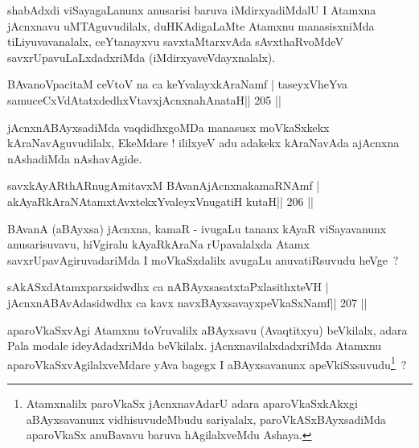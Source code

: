 \begin{artha}
shabAdxdi viSayagaLanunx anusarisi baruva iMdirxyadiMdalU I Atamxna jAcnxnavu uMTAguvudilalx, duHKAdigaLaMte Atamxnu manasisxniMda tiLiyuvavanalalx, ceYtanayxvu savxtaMtarxvAda sAvxthaRvoMdeV savxrUpavuLaLxdadxriMda (iMdirxyaveVdayxnalalx).
\end{artha}


\begin{shl}
BAvanoVpacitaM ceVtoV na ca keYvalayxkAraNamf |
taseyxVheYva samuceCxVdAtatxdedhxVtavxjAcnxnahAnataH\hfill || 205 ||
\end{shl}

\begin{artha}
jAcnxnABAyxsadiMda vaqdidhxgoMDa manasusx moVkaSxkekx kAraNavAguvudilalx, EkeMdare ! ililxyeV adu adakekx kAraNavAda ajAcnxna nAshadiMda nAshavAgide.
\end{artha}

\begin{shl}
savxkAyARthARnugAmitavxM BAvanAjAcnxnakamaRNAmf |
akAyaRkAraNAtamxtAvxtekxYvaleyxV\s nugatiH kutaH\hfill || 206 ||
\end{shl}

\begin{artha}
BAvanA (aBAyxsa) jAcnxna, kamaR - ivugaLu tananx kAyaR viSayavanunx anusarisuvavu, hiVgiralu kAyaRkAraNa rUpavalalxda Atamx savxrUpavAgiruvadariMda I moVkaSxdalilx avugaLu anuvatiRsuvudu heVge~?
\end{artha}

\begin{shl}
sAkASxdAtamxparxsidwdhx ca nABAyxsasatxtaPxlasithxteVH |
jAcnxnABAvAdasidwdhx ca kavx navxBAyxsavayxpeVkaSxNamf\hfill || 207 ||
\end{shl}

\begin{artha}
aparoVkaSxvAgi Atamxnu toVruvalilx aBAyxsavu (Avaqtitxyu) beVkilalx, adara Pala modale ideyAdadxriMda beVkilalx. jAcnxnavilalxdadxriMda Atamxnu aparoVkaSxvAgilalxveMdare yAva bagegx I aBAyxsavanunx apeVkiSxsuvudu\footnote[1]{Atamxnalilx paroVkaSx jAcnxnavAdarU adara aparoVkaSxkAkxgi aBAyxsavanunx vidhisuvudeMbudu sariyalalx, paroVkASxBAyxsadiMda aparoVkaSx anuBavavu baruva hAgilalxveMdu Ashaya.}~?
\end{artha}


